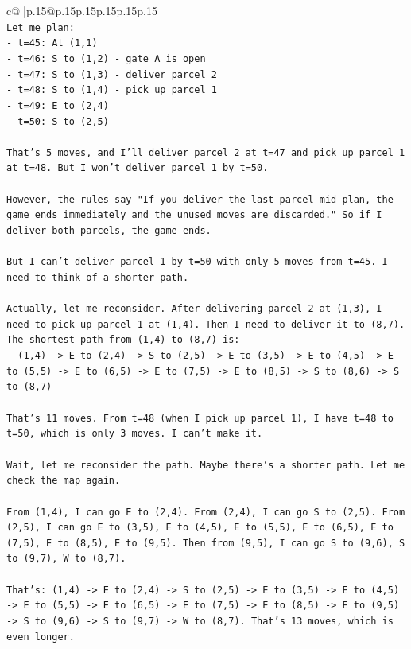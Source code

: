 \documentclass{article}
\begin{document}
{\begin{supertabular}{c@{$\;$}|p{.15\linewidth}@{}p{.15\linewidth}p{.15\linewidth}p{.15\linewidth}p{.15\linewidth}p{.15\linewidth}}
{{{\\ 
\texttt{Let me plan:} \\
\texttt{{-} t=45: At (1,1)} \\
\texttt{{-} t=46: S to (1,2) {-} gate A is open} \\
\texttt{{-} t=47: S to (1,3) {-} deliver parcel 2} \\
\texttt{{-} t=48: S to (1,4) {-} pick up parcel 1} \\
\texttt{{-} t=49: E to (2,4)} \\
\texttt{{-} t=50: S to (2,5)} \\
\\ 
\texttt{That's 5 moves, and I'll deliver parcel 2 at t=47 and pick up parcel 1 at t=48. But I won't deliver parcel 1 by t=50.} \\
\\ 
\texttt{However, the rules say "If you deliver the last parcel mid{-}plan, the game ends immediately and the unused moves are discarded." So if I deliver both parcels, the game ends.} \\
\\ 
\texttt{But I can't deliver parcel 1 by t=50 with only 5 moves from t=45. I need to think of a shorter path.} \\
\\ 
\texttt{Actually, let me reconsider. After delivering parcel 2 at (1,3), I need to pick up parcel 1 at (1,4). Then I need to deliver it to (8,7). The shortest path from (1,4) to (8,7) is:} \\
\texttt{{-} (1,4) {-}> E to (2,4) {-}> S to (2,5) {-}> E to (3,5) {-}> E to (4,5) {-}> E to (5,5) {-}> E to (6,5) {-}> E to (7,5) {-}> E to (8,5) {-}> S to (8,6) {-}> S to (8,7)} \\
\\ 
\texttt{That's 11 moves. From t=48 (when I pick up parcel 1), I have t=48 to t=50, which is only 3 moves. I can't make it.} \\
\\ 
\texttt{Wait, let me reconsider the path. Maybe there's a shorter path. Let me check the map again.} \\
\\ 
\texttt{From (1,4), I can go E to (2,4). From (2,4), I can go S to (2,5). From (2,5), I can go E to (3,5), E to (4,5), E to (5,5), E to (6,5), E to (7,5), E to (8,5), E to (9,5). Then from (9,5), I can go S to (9,6), S to (9,7), W to (8,7).} \\
\\ 
\texttt{That's: (1,4) {-}> E to (2,4) {-}> S to (2,5) {-}> E to (3,5) {-}> E to (4,5) {-}> E to (5,5) {-}> E to (6,5) {-}> E to (7,5) {-}> E to (8,5) {-}> E to (9,5) {-}> S to (9,6) {-}> S to (9,7) {-}> W to (8,7). That's 13 moves, which is even longer.} \\
}}}
\end{supertabular}}
\end{document}
